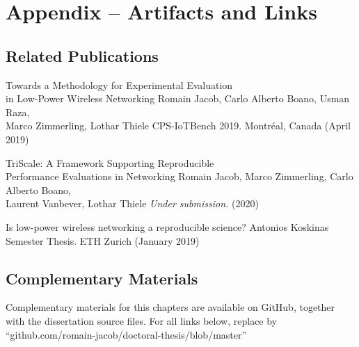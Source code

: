 \section{Appendix -- Artifacts and Links}
\label{append:triscale_artifacts}

\subsection{Related Publications}

\inlineRef%
{Towards a Methodology for Experimental Evaluation\\
in Low-Power Wireless Networking}%
{Romain Jacob, Carlo Alberto Boano, Usman Raza,\\
Marco Zimmerling, Lothar Thiele}%
{CPS-IoTBench 2019. Montréal, Canada (April 2019)}


\inlineRef%
{TriScale: A Framework Supporting Reproducible\\Performance Evaluations in Networking}%
{Romain Jacob, Marco Zimmerling, Carlo Alberto Boano,\\
Laurent Vanbever, Lothar Thiele}%
{\emph{Under submission.} (2020)}


\inlineRef%
{Is low-power wireless networking a reproducible science?}%
{Antonios Koskinas}%
{Semester Thesis. ETH Zurich (January 2019)}


\subsection{Complementary Materials}
Complementary materials for this chapters are available on GitHub, together with the dissertation source files. For all links below, replace \linkroot  by ``{github.com/romain-jacob/doctoral-thesis/blob/master}''

